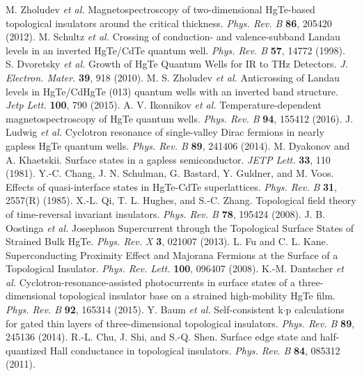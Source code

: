 \documentclass[titlepage,a4paper]{book}
\begin{document}
\begin{thebibliography}{199}
M. Zholudev \textit{et al.} Magnetospectroscopy of two-dimensional HgTe-based topological insulators around the critical thickness. \textit{Phys. Rev. B} \textbf{86}, 205420 (2012).
M. Schultz \textit{et al.} Crossing of conduction- and valence-subband Landau levels in an inverted HgTe/CdTe quantum well. \textit{Phys. Rev. B} \textbf{57}, 14772 (1998).
S. Dvoretsky \textit{et al.} Growth of HgTe Quantum Wells for IR to THz Detectors. \textit{J. Electron. Mater.} \textbf{39}, 918 (2010).
M. S. Zholudev \textit{et al.} Anticrossing of Landau levels in HgTe/CdHgTe (013) quantum wells with an inverted band structure. \textit{Jetp Lett.} \textbf{100}, 790 (2015).
A. V. Ikonnikov \textit{et al.} Temperature-dependent magnetospectroscopy of HgTe quantum wells. \textit{Phys. Rev. B} \textbf{94}, 155412 (2016).
J. Ludwig \textit{et al.} Cyclotron resonance of single-valley Dirac fermions in nearly gapless HgTe quantum wells. \textit{Phys. Rev. B} \textbf{89}, 241406 (2014).
M. Dyakonov and A. Khaetskii. Surface states in a gapless semiconductor. \textit{JETP Lett.} \textbf{33}, 110 (1981).
Y.-C. Chang, J. N. Schulman, G. Bastard, Y. Guldner, and M. Voos. Effects of quasi-interface states in HgTe-CdTe superlattices. \textit{Phys. Rev. B} \textbf{31}, 2557(R) (1985).
X.-L. Qi, T. L. Hughes, and S.-C. Zhang. Topological field theory of time-reversal invariant insulators. \textit{Phys. Rev. B} \textbf{78}, 195424 (2008).
J. B. Oostinga \textit{et al.} Josephson Supercurrent through the Topological Surface States of Strained Bulk HgTe. \textit{Phys. Rev. X} \textbf{3}, 021007 (2013).
L. Fu and C. L. Kane. Superconducting Proximity Effect and Majorana Fermions at the Surface of a Topological Insulator. \textit{Phys. Rev. Lett.} \textbf{100}, 096407 (2008).
K.-M. Dantscher \textit{et al.} Cyclotron-resonance-assisted photocurrents in surface states of a three-dimensional topological insulator base on a strained high-mobility HgTe film. \textit{Phys. Rev. B} \textbf{92}, 165314 (2015).
Y. Baum \textit{et al.} Self-consistent k$\cdot$p calculations for gated thin layers of three-dimensional topological insulators. \textit{Phys. Rev. B} \textbf{89}, 245136 (2014).
R.-L. Chu, J. Shi, and S.-Q. Shen. Surface edge state and half-quantized Hall conductance in topological insulators. \textit{Phys. Rev. B} \textbf{84}, 085312 (2011). 

\end{thebibliography}
\end{document}
